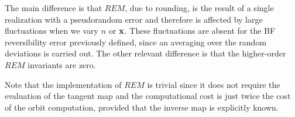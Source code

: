 The main difference is that $REM$, due to rounding, is the result of a single realization with a pseudorandom error and therefore is affected by large fluctuations when we vary $n$ or $\vb{x}$. These fluctuations are absent for the BF reversibility error previously defined, since an averaging over the random deviations is carried out. The other relevant difference is that the higher-order $REM$ invariants are zero.

Note that the implementation of $REM$ is trivial since it does not require the evaluation of the tangent map and the computational cost is just twice the cost of the orbit computation, provided that the inverse map is explicitly known. %
%
